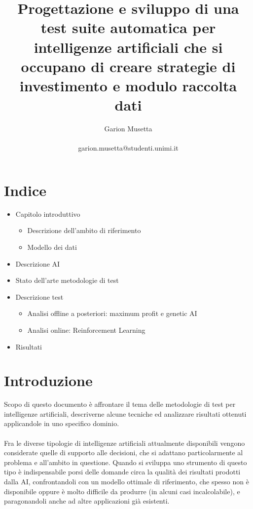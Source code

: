 \documentclass{article}
\title{\textbf{Progettazione e sviluppo di una test suite automatica per intelligenze artificiali che si occupano di creare strategie di investimento e modulo raccolta dati}}
\author{Garion Musetta\\~\\garion.musetta@studenti.unimi.it}
\begin{document}
	\maketitle   
	\newpage
	 
	\section{Indice}
	\begin{itemize}
		\item Capitolo introduttivo
			\begin{itemize}
			\item Descrizione dell'ambito di riferimento
			\item Modello dei dati
			\end{itemize}
			
		\item Descrizione AI
		\item Stato dell'arte metodologie di test
		\item Descrizione test
			\begin{itemize}
				\item Analisi offline a posteriori: maximum profit e genetic AI
				\item Analisi online: Reinforcement Learning
			\end{itemize}
		\item Risultati
	\end{itemize}
	\newpage 
	 
	 
   	\section{Introduzione}
		Scopo di questo documento è affrontare il tema delle metodologie di test per intelligenze artificiali, descriverne alcune tecniche ed analizzare risultati ottenuti applicandole in uno specifico dominio.
		\\~\\
		Fra le diverse tipologie di intelligenze artificiali attualmente disponibili vengono considerate quelle di supporto alle decisioni, che si adattano particolarmente al problema e all'ambito in questione. Quando si sviluppa uno strumento di questo tipo è indispensabile porsi delle domande circa la qualità dei risultati prodotti dalla AI, confrontandoli con un modello ottimale di riferimento, che spesso non è disponibile oppure è molto difficile da produrre (in alcuni casi incalcolabile), e paragonandoli anche ad altre applicazioni già esistenti.
\end{document}
